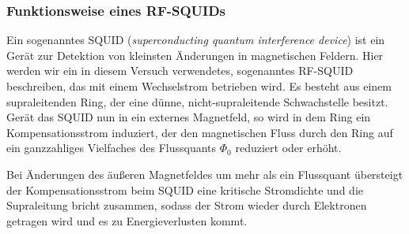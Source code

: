 \documentclass[a4paper,ngerman]{scrartcl}
\begin{document}





\FloatBarrier
\subsubsection{Funktionsweise eines RF-SQUIDs}
Ein sogenanntes SQUID (\emph{superconducting quantum interference device}) 
ist ein Gerät zur Detektion von kleinsten Änderungen in
magnetischen Feldern. 
Hier werden wir ein  in diesem Versuch verwendetes, sogenanntes RF-SQUID beschreiben, 
das mit einem Wechselstrom betrieben wird.
Es besteht aus einem supraleitenden Ring, der eine dünne, nicht-supraleitende Schwachstelle besitzt. 
Gerät das SQUID nun in ein externes Magnetfeld,
so wird in dem Ring ein Kompensationsstrom induziert,
der den magnetischen Fluss durch den Ring auf ein ganzzahliges 
Vielfaches des Flussquants $\Phi_0$ reduziert oder erhöht.

Bei Änderungen des äußeren Magnetfeldes um mehr als ein Flussquant übersteigt der Kompensationsstrom beim SQUID eine kritische Stromdichte und die Supraleitung bricht zusammen, 
sodass der Strom wieder durch Elektronen getragen wird und es zu 
Energieverlusten kommt.
\end{document}
